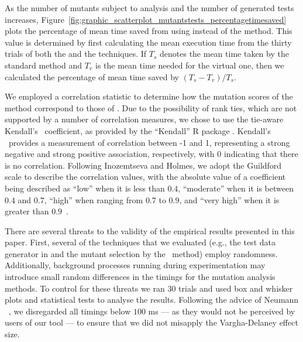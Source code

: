 
As the number of mutants subject to analysis and the number of generated tests increases, Figure~\ref{fig:graphic_scatterplot_mutantstests_percentagetimesaved} plots the percentage of mean time saved from using \vma instead of the \Original method.  This value is determined by first calculating the mean execution time from the thirty trials of both the \Standard and the \virtual techniques. If $T_s$ denotes the mean time taken by the standard method and $T_v$ is the mean time needed for the virtual one, then we calculated the percentage of mean time saved by $({T_s - T_v})/{T_s}$.


We employed a correlation statistic to determine how the mutation scores of the \tc method correspond to those of \vma.  Due to the possibility of rank ties, which are not supported by a number of correlation measures, we chose to use the tie-aware Kendall's \taub~coefficient, as provided by the ``Kendall'' R package \cite{KendallCran}.  Kendall's \taub~provides a measurement of correlation between -1 and 1, representing a strong negative and strong positive association, respectively, with 0 indicating that there is no correlation. Following Inozemtseva and Holmes, we adopt the Guildford scale to describe the correlation values, with the absolute value of a coefficient being described as ``low'' when it is less than $0.4$, ``moderate'' when it is between $0.4$ and $0.7$, ``high'' when ranging from $0.7$ to $0.9$, and ``very high'' when it is greater than \mbox{$0.9$ \cite{Inozemtseva2014}}.





 There are several threats to the validity of the empirical results presented in this paper. First, several of the techniques that we evaluated (e.g., the test data generator in \SA and the mutant selection by the \tcm~method) employ randomness. Additionally, background processes running during experimentation may introduce small random differences in the timings for the mutation analysis methods. To control for these threats we ran 30 trials and used box and whisker plots and statistical tests to analyse the results. Following the advice of Neumann \etal~\cite{Neumann2015}, we disregarded all timings below $100$ ms --- as they would not be perceived by users of our tool --- to ensure that we did not misapply the Vargha-Delaney effect size.

